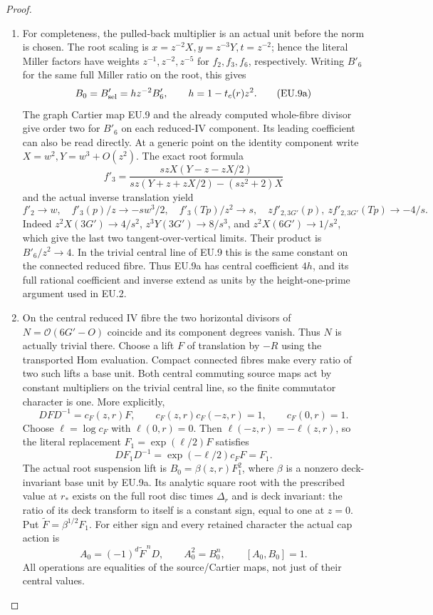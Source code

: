 \begin{proof}
\begin{enumerate}[label=\arabic*.]
\item For completeness, the pulled-back multiplier is an actual unit before
the norm is chosen. The root scaling is
\(x=z^{-2}X,y=z^{-3}Y,t=z^{-2}\); hence the literal Miller factors
have weights \(z^{-1},z^{-2},z^{-5}\) for \(f_2,f_3,f_6\), respectively.
Writing \(B'_6\) for the same full Miller ratio on the root, this gives
\[
 B_0=B'_{\rm sel}=h z^{-2}B'_6,\qquad
 h=1-t_c(r)z^2.
 \tag{EU.9a}
\]
The graph Cartier map EU.9 and the already computed whole-fibre divisor
give order two for \(B'_6\) on each reduced-IV component. Its leading
coefficient can also be read directly. At a generic point on the
identity component write \(X=w^2,Y=w^3+O(z^2)\). The exact root formula
\[
 f'_3=\frac{s zX(Y-z-zX/2)}
              {s z(Y+z+zX/2)-(s z^2+2)X}
\]
and the actual inverse translation yield
\[
 f'_2\to w,\quad f'_3(p)/z\to-s w^3/2,\quad
 f'_3(Tp)/z^2\to s,\quad
 z f'_{2,3G'}(p),\ z f'_{2,3G'}(Tp)\to-4/s.
\]
Indeed \(z^2X(3G')\to4/s^2\),
\(z^3Y(3G')\to8/s^3\), and \(z^2X(6G')\to1/s^2\),
which give the last two tangent-over-vertical limits. Their product
is \(B'_6/z^2\to4\). In the trivial central line of EU.9 this is
the same constant on the connected reduced fibre. Thus EU.9a has
central coefficient \(4h\), and its full rational coefficient and
inverse extend as units by the height-one-prime argument used in EU.2.

\item On the central reduced IV fibre the two horizontal divisors of
\(N=\mathcal O(6G'-O)\) coincide and its component degrees vanish.
Thus \(N\) is actually trivial there. Choose a lift \(F\) of
translation by \(-R\) using the transported Hom evaluation. Compact
connected fibres make every ratio of two such lifts a base unit.
Both central commuting source maps act by constant multipliers on
the trivial central line, so the finite commutator character is one.
More explicitly,
\[
 DFD^{-1}=c_F(z,r)F,\qquad
 c_F(z,r)c_F(-z,r)=1,\qquad c_F(0,r)=1.
\]
Choose \(\ell=\log c_F\) with \(\ell(0,r)=0\). Then
\(\ell(-z,r)=-\ell(z,r)\), so the literal replacement
\(F_1=\exp(\ell/2)F\) satisfies
\[
 DF_1D^{-1}=\exp(-\ell/2)c_FF=F_1.
\]
The actual root suspension lift is
\(B_0=\beta(z,r)F_1^2\), where \(\beta\) is a nonzero
deck-invariant base unit by EU.9a. Its analytic square root with
the prescribed value at \(r_*\) exists on the full root disc times
\(\Delta_r\) and is deck invariant: the ratio of its deck transform
to itself is a constant sign, equal to one at \(z=0\).
Put \(\widetilde F=\beta^{1/2}F_1\). For either sign and every retained
character the actual cap action is
\[
 A_0=(-1)^d\widetilde F^{\,n}D,\qquad
 A_0^2=B_0^n,\qquad [A_0,B_0]=1.
 \tag{EU.10}
\]
All operations are equalities of the source/Cartier maps, not just
of their central values.


\end{enumerate}
\end{proof}
